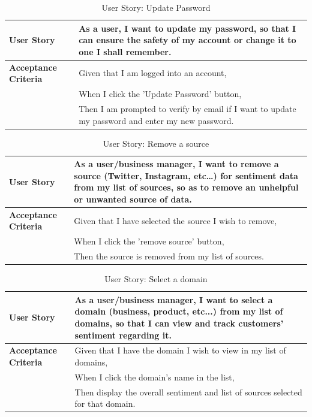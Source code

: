 \documentclass[12pt]{article}
\begin{document}
\begin{table}[htbp]
\caption{User Story: Update Password}
\begin{tabular}{|p{}|p{}|}
\hline
\textbf{User Story} & As a user, I want to update my password, so that I can ensure the safety of my account or change it to one I shall remember. \\
\hline
\textbf{Acceptance Criteria} & 
Given that I am logged into an account,\\
& When I click the 'Update Password' button,\\
& Then I am prompted to verify by email if I want to update my password and enter my new password. \\
\hline
\end{tabular}
\end{table}
\begin{table}[htbp]
\caption{User Story: Remove a source}
\begin{tabular}{|p{}|p{}|}
\hline
\textbf{User Story} & As a user/business manager, I want to remove a source (Twitter, Instagram, etc…) for sentiment data from my list of sources, so as to remove an unhelpful or unwanted source of data. \\
\hline
\textbf{Acceptance Criteria} & 
Given that I have selected the source I wish to remove,\\
& When I click the 'remove source' button,\\
& Then the source is removed from my list of sources. \\
\hline
\end{tabular}
\end{table}

\begin{table}[htbp]
\caption{User Story: Select a domain}
\begin{tabular}{|p{}|p{}|}
\hline
\textbf{User Story} & As a user/business manager, I want to select a domain (business, product, etc...) from my list of domains, so that I can view and track customers' sentiment regarding it. \\
\hline
\textbf{Acceptance Criteria} & 
Given that I have the domain I wish to view in my list of domains,\\
& When I click the domain's name in the list,\\
& Then display the overall sentiment and list of sources selected for that domain. \\
\hline
\end{tabular}
\end{table}
\end{document}

